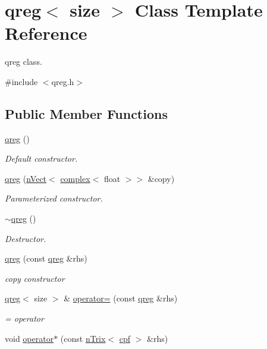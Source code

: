 \hypertarget{classqreg}{}\section{qreg$<$ size $>$ Class Template Reference}
\label{classqreg}


qreg class.  




{\ttfamily \#include $<$qreg.\+h$>$}

\subsection*{Public Member Functions}
\begin{DoxyCompactItemize}
\item 
\hyperlink{classqreg_af90cf81369c4ec6058038497f7a1c870}{qreg} ()
\begin{DoxyCompactList}\small\item\em Default constructor. \end{DoxyCompactList}\item 
\hyperlink{classqreg_ae08c9f05247bf65c36bd8301dbcae423}{qreg} (\hyperlink{classnVect}{n\+Vect}$<$ \hyperlink{classcomplex}{complex}$<$ float $>$$>$ \&copy)
\begin{DoxyCompactList}\small\item\em Parameterized constructor. \end{DoxyCompactList}\item 
\hyperlink{classqreg_a61323454f297a9bb149febf889d54914}{$\sim$qreg} ()
\begin{DoxyCompactList}\small\item\em Destructor. \end{DoxyCompactList}\item 
\hyperlink{classqreg_afbb6aeb20d3e963cebd5d8063221b872}{qreg} (const \hyperlink{classqreg}{qreg} \&rhs)
\begin{DoxyCompactList}\small\item\em copy constructor \end{DoxyCompactList}\item 
\hyperlink{classqreg}{qreg}$<$ size $>$ \& \hyperlink{classqreg_a677e4810f14987e619b6b5c9a6a75b4c}{operator=} (const \hyperlink{classqreg}{qreg} \&rhs)
\begin{DoxyCompactList}\small\item\em = operator \end{DoxyCompactList}\item 
void \hyperlink{classqreg_abb87cb06dc40f43592943c1c72630269}{operator$\ast$} (const \hyperlink{classnTrix}{n\+Trix}$<$ \hyperlink{gatedata_8h_a0c9667bfe3ded0fa2cd4fab281edbe24}{cpf} $>$ \&rhs)
$$
\end{DoxyCompactItemize}
